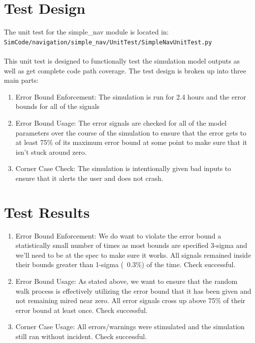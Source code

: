 \documentclass[]{BasiliskReportMemo}
\begin{document}
\section{Test Design}
The unit test for the simple\_nav module is located in:\\

\noindent
{\tt SimCode/navigation/simple\_nav/UnitTest/SimpleNavUnitTest.py} \\
\\

\noindent This unit test is designed to functionally test the simulation model 
outputs as well as get complete code path coverage.  The test design is broken 
up into three main parts:\\
\begin{enumerate}
\item{Error Bound Enforcement: The simulation is run for 2.4 hours and the 
   error bounds for all of the signals }
\item{Error Bound Usage: The error signals are checked for all of the model 
   parameters over the course of the simulation to ensure that the error gets 
   to at least 75\% of its maximum error bound at some point to make sure that 
   it isn't stuck around zero.}
\item{Corner Case Check: The simulation is intentionally given bad inputs to 
   ensure that it alerts the user and does not crash.}
\end{enumerate}


\section{Test Results}
\begin{enumerate}
\item{Error Bound Enforcement: We do want to violate the error bound a 
   statistically small number of times as most bounds are specified 3-sigma 
   and we'll need to be at the spec to make sure it works.  All signals remained 
   inside their bounds greater than 1-sigma (~0.3\%) of the time.  Check 
   successful. }
\item{Error Bound Usage: As stated above, we want to ensure that the random 
   walk process is effectively utilizing the error bound that it has been 
   given and not remaining mired near zero.  All error signals cross up above 
   75\% of their error bound at least once.  Check successful.}
\item{Corner Case Usage: All errors/warnings were stimulated and the simulation 
   still ran without incident.  Check successful.}
\end{enumerate}
\end{document}
